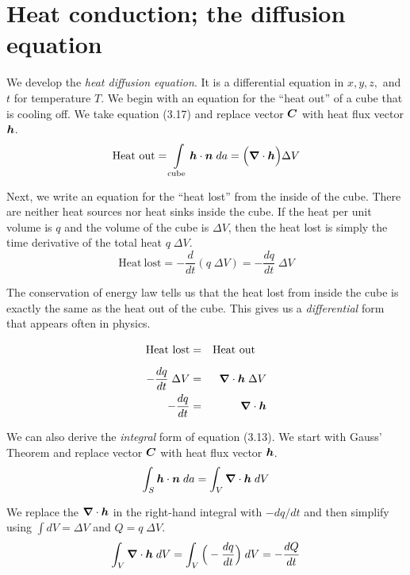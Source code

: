 \section{Heat conduction; the diffusion equation}

We develop the \emph{heat diffusion equation}.
It is a differential equation in $x, y, z,$ and $t$ for temperature $T$.
We begin with an equation for the ``heat out'' of a cube that is cooling off.
We take equation (3.17) and replace vector $\boldsymbol{C}$ with heat flux vector $\boldsymbol{h}$.
\begin{equation}
  \mathrm{Heat\ out} = \int\limits_{\mathrm{cube}}
  \boldsymbol{h} \cdot \boldsymbol{n} \; da = \Big( \boldsymbol{\nabla} \cdot \boldsymbol{h} \Big) \Delta V
\end{equation}

Next, we write an equation for the ``heat lost'' from the inside of the cube.
There are neither heat sources nor heat sinks inside the cube.
If the heat per unit volume is $q$ and the volume of the cube is $\Delta V$,
then the heat lost is simply the time derivative of the total heat $q\;\Delta V$.
\begin{equation}
  \mathrm{Heat\ lost} = - \frac{d}{dt} (q \; \Delta V) = - \frac{dq}{dt} \; \Delta V
\end{equation}

The conservation of energy law tells us that the heat lost from inside the cube
is exactly the same as the heat out of the cube.
This gives us a \emph{differential} form that appears often in physics.
\begin{eqnarray}
  \mathrm{Heat\ lost} &=& \mathrm{Heat\ out} \phantom{\int} \nonumber\\
  - \frac{dq}{dt} \; \Delta V &=& \boldsymbol{\nabla} \cdot \boldsymbol{h} \; \Delta V \nonumber\\
  - \frac{dq}{dt} &=& \boldsymbol{\nabla} \cdot \boldsymbol{h}
\end{eqnarray}

We can also derive the \emph{integral} form of equation (3.13).
We start with Gauss' Theorem and replace vector $\boldsymbol{C}$ with heat flux vector $\boldsymbol{h}$.
\begin{equation}
  \int_S \boldsymbol{h} \cdot \boldsymbol{n} \; da = \int_V \boldsymbol{\nabla} \cdot \boldsymbol{h} \; dV
\end{equation}

We replace the $\boldsymbol{\nabla} \cdot \boldsymbol{h}$ in the right-hand integral with $-dq/dt$
and then simplify using $\int dV = \Delta V$ and $Q = q\;\Delta V$.
\begin{equation*}
  \int_V \boldsymbol{\nabla} \cdot \boldsymbol{h} \; dV
  = \int_V \Big(-\frac{dq}{dt}\Big) \; dV
  = - \frac{dQ}{dt}
\end{equation*}

